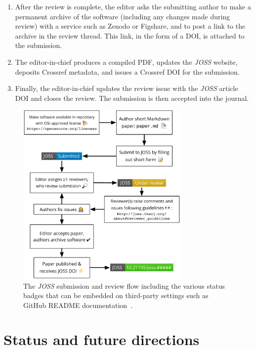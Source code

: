 \documentclass{article}
\newcommand\joss{\textit{JOSS}}
\begin{document}
\begin{enumerate}
\item After the review is complete, the editor asks the submitting author to make a permanent archive of the software (including any changes made during review) with a service such as Zenodo or Figshare, and to post a link to the archive in the review thread. This link, in the form of a DOI, is attached to the submission.

\item The editor-in-chief produces a compiled PDF, updates the \joss{} website, deposits Crossref metadata, and issues a Crossref DOI for the submission. 

\item Finally, the editor-in-chief updates the review issue with the \joss{} article DOI and closes the review. The submission is then accepted into the journal.

\end{enumerate}
\begin{figure}[htp]
\centering
\includegraphics[width=0.75\textwidth]{JOSS-flowchart.pdf}
\caption{The \joss{} submission and review flow including the various status badges that can be embedded on third-party settings such as GitHub README documentation~\cite{JOSS-publication-workflow}.
\label{fig:submission-flow}}
\end{figure}


\section{Status and future directions}
\end{document}
